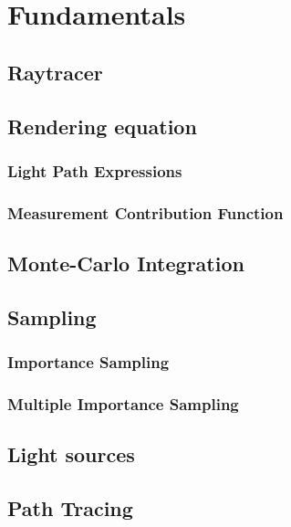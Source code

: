 \chapter{Fundamentals}
\label{ch:Fundamentals}

\section{Raytracer}



\section{Rendering equation}

\subsection{Light Path Expressions}
\subsection{Measurement Contribution Function}




\section{Monte-Carlo Integration}



\section{Sampling}

\subsection{Importance Sampling}

\subsection{Multiple Importance Sampling}



\section{Light sources}


\section{Path Tracing}
